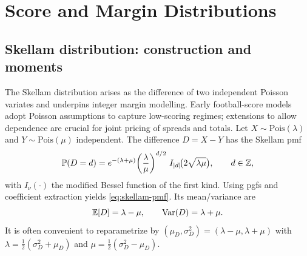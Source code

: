 

\section{Score and Margin Distributions}
\subsection{Skellam distribution: construction and moments}\label{subsec:skellam-mom}
The Skellam distribution \citep{skellam1946} arises as the difference of two independent Poisson variates and underpins integer margin modelling. Early football-score models \citep{maher1982,dixon1997} adopt Poisson assumptions to capture low-scoring regimes; extensions to allow dependence \citep{karlis2003,koopman2015} are crucial for joint pricing of spreads and totals.
Let $X\sim\mathrm{Pois}(\lambda)$ and $Y\sim\mathrm{Pois}(\mu)$ independent. The difference
$D=X-Y$ has the Skellam pmf
\begin{equation}\label{eq:skellam-pmf}
\mathbb{P}(D=d)=e^{-(\lambda+\mu)}\!\left(\frac{\lambda}{\mu}\right)^{d/2}
\,I_{|d|}\!\big(2\sqrt{\lambda\mu}\big),\qquad d\in\mathbb{Z},
\end{equation}
with $I_\nu(\cdot)$ the modified Bessel function of the first kind. Using pgfs and coefficient
extraction yields \eqref{eq:skellam-pmf}. Its mean/variance are
\begin{equation}\label{eq:skellam-moments}
\mathbb{E}[D]=\lambda-\mu,\qquad \mathrm{Var}(D)=\lambda+\mu.
\end{equation}
It is often convenient to reparametrize by $(\mu_D,\sigma_D^2)=(\lambda-\mu,\lambda+\mu)$ with
$\lambda=\tfrac12(\sigma_D^2+\mu_D)$ and $\mu=\tfrac12(\sigma_D^2-\mu_D)$.

